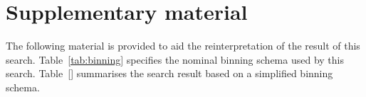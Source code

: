 \clearpage



\appendix


\clearpage
\section*{Supplementary material} 

The following material is provided to aid the reinterpretation of the
result of this search. Table~\ref{tab:binning} specifies the nominal
binning schema used by this search. Table~\ref{} summarises the search
result based on a simplified binning schema. 

